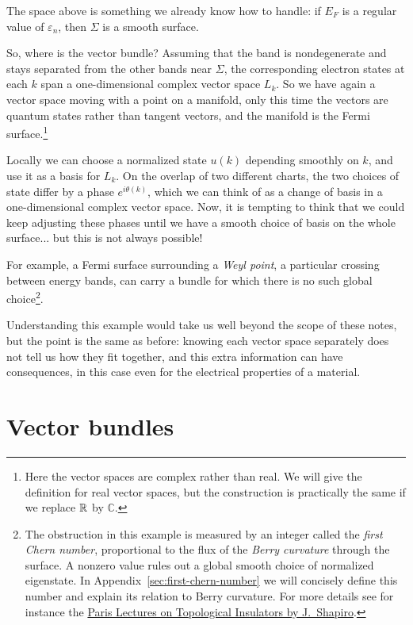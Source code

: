 The space above is something we already know how to handle: if $E_F$ is a regular value of $\varepsilon_n$, then $\Sigma$ is a smooth surface.

So, where is the vector bundle? Assuming that the band is nondegenerate and stays separated from the other bands near $\Sigma$, the corresponding electron states at each $k$ span a one-dimensional complex vector space $L_k$.
So we have again a vector space moving with a point on a manifold, only this time the vectors are quantum states rather than tangent vectors, and the manifold is the Fermi surface.\footnote{Here the vector spaces are complex rather than real. We will give the definition for real vector spaces, but the construction is practically the same if we replace $\mathbb{R}$ by $\mathbb{C}$.}

Locally we can choose a normalized state $u(k)$ depending smoothly on $k$, and use it as a basis for $L_k$.
On the overlap of two different charts, the two choices of state differ by a phase $e^{i\theta(k)}$, which we can think of as a change of basis in a one-dimensional complex vector space.
Now, it is tempting to think that we could keep adjusting these phases until we have a smooth choice of basis on the whole surface... but this is not always possible!

For example, a Fermi surface surrounding a \emph{Weyl point}, a particular crossing between energy bands, can carry a bundle for which there is no such global choice\footnote{The obstruction in this example is measured by an integer called the \emph{first Chern number}, proportional to the flux of the \emph{Berry curvature} through the surface. A nonzero value rules out a global smooth choice of normalized eigenstate. In Appendix~\ref{sec:first-chern-number} we will concisely define this number and explain its relation to Berry curvature. For more details see for instance the \href{https://web.math.princeton.edu/~js129/PDFs/paris_top_insul_july_2022.pdf}{Paris Lectures on Topological Insulators by J.~Shapiro}.}.

Understanding this example would take us well beyond the scope of these notes, but the point is the same as before: knowing each vector space separately does not tell us how they fit together, and this extra information can have consequences, in this case even for the electrical properties of a material.

\section{Vector bundles}\label{sec:vec-bdls}

